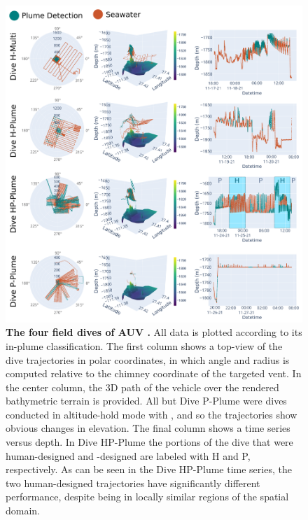 \begin{figure}
    \centering
    \includegraphics[width=1\linewidth]{figures/detections_data.png}
    \caption[The four field dives of AUV \Sentry.]{\textbf{The four field dives of AUV \Sentry.} All data is plotted according to its in-plume classification. The first column shows a top-view of the dive trajectories in polar coordinates, in which angle and radius is computed relative to the chimney coordinate of the targeted vent. In the center column, the 3D path of the vehicle over the rendered bathymetric terrain is provided. All but Dive P-Plume were dives conducted in altitude-hold mode with \Sentry, and so the trajectories show obvious changes in elevation. The final column shows a time series versus depth. In Dive HP-Plume the portions of the dive that were human-designed and \PHORTEX-designed are labeled with H and P, respectively. As can be seen in the Dive HP-Plume time series, the two human-designed trajectories have significantly different performance, despite being in locally similar regions of the spatial domain.}
    \label{fig:field_results}
\end{figure}

